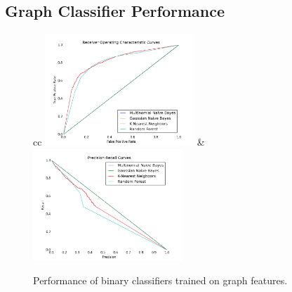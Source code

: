 \documentclass{article} %
\begin{document}

\subsection{Graph Classifier Performance}

\begin{figure}[!hbt]
\label{fig:classifiers}
\begin{tabular}{cc}
\includegraphics[width=0.5\textwidth]{figs/roc.png} &
\includegraphics[width=0.5\textwidth]{figs/prc.png} \\
\end{tabular}
\caption{Performance of binary classifiers trained on graph features.}
\end{figure}
\end{document}
